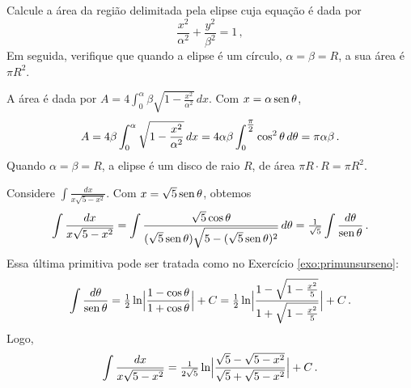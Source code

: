\begin{exo}
Calcule a área da região delimitada pela elipse cuja equação é
dada por
$$
\frac{x^2}{\alpha^2}+\frac{y^2}{\beta^2}=1\,,
$$
Em seguida, verifique que quando a elipse é um círculo, $\alpha=\beta=R$, a sua área é
$\pi R^2$.  
\begin{sol}
A área é dada por $A=4\int_0^{\alpha}\beta\sqrt{1-\frac{x^2}{\alpha^2}}\,dx$.
Com $x=\alpha\operatorname{sen} \theta$, 
$$A=4\beta\int_0^{\alpha}\sqrt{1-\frac{x^2}{\alpha^2}}\,dx=
4\alpha\beta \int_0^{\tfrac{\pi}{2}}\cos^2\theta\,d\theta=\pi \alpha\beta\,.
$$
Quando $\alpha=\beta=R$, a elipse é um disco de raio $R$, de área $\pi 
R\cdot R=\pi R^2$.
\end{sol}
\end{exo}


\begin{ex}
Considere $\int \frac{dx}{x\sqrt{5-x^2}}$.
Com $x=\sqrt{5}\operatorname{sen} \theta$, obtemos
$$\int \frac{dx}{x\sqrt{5-x^2}}=
\int\frac{\sqrt{5}\cos \theta}{(\sqrt{5}\operatorname{sen} \theta)\sqrt{5-(\sqrt{5}\operatorname{sen}
\theta)^2}}\,d\theta
=\tfrac{1}{\sqrt{5}}\int\frac{d\theta}{\operatorname{sen} \theta}\,.
$$
Essa última primitiva pode ser tratada como no Exercício
\ref{exo:primunsurseno}:
$$
\int\frac{d\theta}{\operatorname{sen} \theta}=\tfrac12\ln \Bigl|\frac{1-\cos
\theta}{1+\cos\theta}\Bigr|+C=\tfrac{1}{2}\ln\Bigl|\frac{1-\sqrt{1-\frac{x^2}{5}
} } { 1+\sqrt{1-\frac{x^2}{5}
} } \Bigr|+C\,.
$$
Logo,
$$
\int
\frac{dx}{x\sqrt{5-x^2}}=\tfrac{1}{2\sqrt{5}}
\ln\Bigl|\frac{\sqrt{5}-\sqrt{5-{x^2}
} } { \sqrt{5}+\sqrt{5-{x^2}
} } \Bigr|+C\,.
$$
\end{ex}

